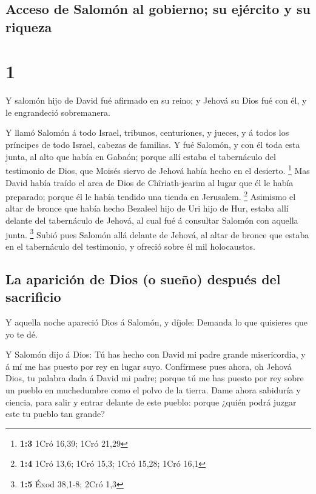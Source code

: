 \hypertarget{acceso-de-salomuxf3n-al-gobierno-su-ejuxe9rcito-y-su-riqueza}{%
\subsection{Acceso de Salomón al gobierno; su ejército y su
riqueza}\label{acceso-de-salomuxf3n-al-gobierno-su-ejuxe9rcito-y-su-riqueza}}

\hypertarget{section}{%
\section{1}\label{section}}

 Y salomón hijo de David fué afirmado en su reino; y Jehová
su Dios fué con él, y le engrandeció sobremanera.

 Y llamó Salomón á todo Israel, tribunos, centuriones, y
jueces, y á todos los príncipes de todo Israel, cabezas de familias.
 Y fué Salomón, y con él toda esta junta, al alto que había
en Gabaón; porque allí estaba el tabernáculo del testimonio de Dios, que
Moisés siervo de Jehová había hecho en el desierto. \footnote{\textbf{1:3}
  1Cró 16,39; 1Cró 21,29}  Mas David había traído el arca de
Dios de Chîriath-jearim al lugar que él le había preparado; porque él le
había tendido una tienda en Jerusalem. \footnote{\textbf{1:4} 1Cró 13,6;
  1Cró 15,3; 1Cró 15,28; 1Cró 16,1}  Asimismo el altar de
bronce que había hecho Bezaleel hijo de Uri hijo de Hur, estaba allí
delante del tabernáculo de Jehová, al cual fué á consultar Salomón con
aquella junta. \footnote{\textbf{1:5} Éxod 38,1-8; 2Cró 1,3}
 Subió pues Salomón allá delante de Jehová, al altar de
bronce que estaba en el tabernáculo del testimonio, y ofreció sobre él
mil holocaustos.

\hypertarget{la-apariciuxf3n-de-dios-o-sueuxf1o-despuuxe9s-del-sacrificio}{%
\subsection{La aparición de Dios (o sueño) después del
sacrificio}\label{la-apariciuxf3n-de-dios-o-sueuxf1o-despuuxe9s-del-sacrificio}}

 Y aquella noche apareció Dios á Salomón, y díjole: Demanda
lo que quisieres que yo te dé.

 Y Salomón dijo á Dios: Tú has hecho con David mi padre
grande misericordia, y á mí me has puesto por rey en lugar suyo.
 Confírmese pues ahora, oh Jehová Dios, tu palabra dada á
David mi padre; porque tú me has puesto por rey sobre un pueblo en
muchedumbre como el polvo de la tierra.  Dame ahora
sabiduría y ciencia, para salir y entrar delante de este pueblo: porque
¿quién podrá juzgar este tu pueblo tan grande?

